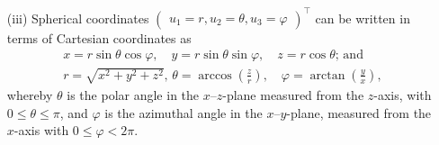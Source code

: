 {\begin{itemize}
\item[(iii)]
Spherical coordinates
$\begin{pmatrix}
u_1=r, u_2=\theta, u_3=\varphi
\end{pmatrix}^\intercal$
can be written in terms of Cartesian coordinates as
\begin{equation}
\begin{split}
x  = r\sin \theta \cos \varphi , \quad
y = r\sin \theta \sin \varphi ,  \quad
z = r\cos \theta  \text{; and}\\
r=\sqrt{x^2+y^2+z^2}\text{, }
\theta = \arccos \left(\frac{z}{r}\right), \quad
\varphi=  \arctan \left(\frac{y}{x}\right),
\end{split}
\label{2018-mm-ch-sc}
\end{equation}
whereby  $\theta$ is the polar angle in the $x$--$z$-plane measured
from the $z$-axis, with $0 \le \theta \le \pi$,
and $\varphi $ is  the azimuthal angle in the $x$--$y$-plane, measured
from the $x$-axis with $0 \le \varphi < 2 \pi$.
\end{itemize}

}
